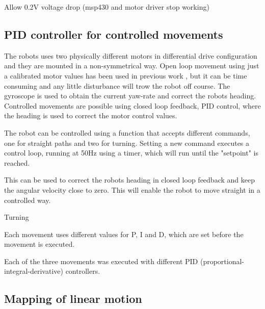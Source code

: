 Allow 0.2V voltage drop (msp430 and motor driver stop working)


 


\subsection{PID controller for controlled movements}





The robots uses two physically different motors in differential drive configuration and they are mounted in a non-symmetrical way.
Open loop movement using just a calibrated motor values has been used in previous work \cite{legoc_uist_2016}, but it can be time consuming and any little disturbance will trow the robot off course.
The gyroscope is used to obtain the current yaw-rate and correct the robots heading.
Controlled movements are possible using closed loop feedback, PID control, where the heading is used to correct the motor control values.

The robot can be controlled using a function that accepts different commands, one for straight paths and two for turning.
Setting a new command executes a control loop, running at 50Hz using a timer, which will run until the "setpoint" is reached.




This can be used to correct the robots heading in closed loop feedback and keep the angular velocity close to zero.
This will enable the robot to move straight in a controlled way.


Turning 


Each movement uses different values for P, I and D, which are set before the movement is executed.

Each of the three movements was executed with different PID (proportional-integral-derivative) controllers. 





\subsection{Mapping of linear motion}